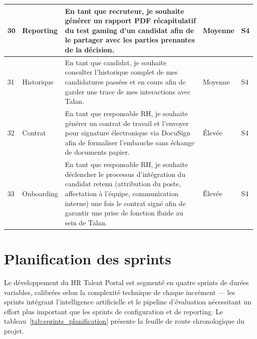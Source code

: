 \begin{longtable}{|p{0.6cm}|p{2.5cm}|p{7.5cm}|p{1.3cm}|p{1.3cm}|}
30 & Reporting & En tant que recruteur, je souhaite générer un rapport PDF récapitulatif du test gaming d'un candidat afin de le partager avec les parties prenantes de la décision. & Moyenne & S4 \\
\hline

31 & Historique & En tant que candidat, je souhaite consulter l'historique complet de mes candidatures passées et en cours afin de garder une trace de mes interactions avec Talan. & Moyenne & S4 \\
\hline

32 & Contrat & En tant que responsable RH, je souhaite générer un contrat de travail et l'envoyer pour signature électronique via DocuSign afin de formaliser l'embauche sans échange de documents papier. & Élevée & S4 \\
\hline

33 & Onboarding & En tant que responsable RH, je souhaite déclencher le processus d'intégration du candidat retenu (attribution du poste, affectation à l'équipe, communication interne) une fois le contrat signé afin de garantir une prise de fonction fluide au sein de Talan. & Élevée & S4 \\
\hline

\end{longtable}

\FloatBarrier

\section{Planification des sprints}

Le développement du HR Talent Portal est segmenté en quatre sprints de durées variables, calibrées selon la complexité technique de chaque incrément --- les sprints intégrant l'intelligence artificielle et le pipeline d'évaluation nécessitant un effort plus important que les sprints de configuration et de reporting. Le tableau~\ref{tab:sprints_planification} présente la feuille de route chronologique du projet.

